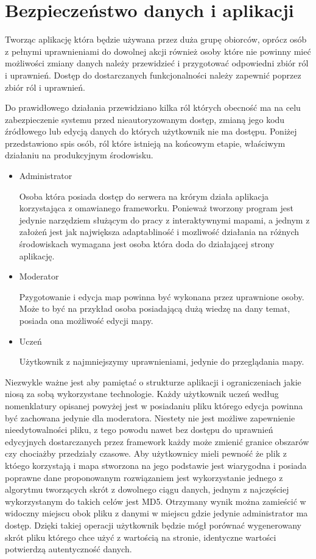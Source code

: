 ﻿\section{Bezpieczeństwo danych i aplikacji}
\label{sec:bezpieczenstwo}

Tworząc aplikację która będzie używana przez duża grupę obiorców, oprócz osób z pełnymi uprawnieniami do dowolnej akcji również osoby które nie powinny mieć możliwości zmiany danych należy przewidzieć i przygotować odpowiedni zbiór ról i uprawnień. Dostęp do dostarczanych funkcjonalności należy zapewnić poprzez zbiór ról i uprawnień.

Do prawidłowego działania przewidziano kilka ról których obecność ma na celu zabezpieczenie systemu przed nieautoryzowanym dostęp, zmianą jego kodu źródłowego lub edycją danych do których użytkownik nie ma dostępu. Poniżej przedstawiono spis osób, ról które istnieją na końcowym etapie, właściwym działaniu na produkcyjnym środowisku.

\begin{itemize}
\item
Administrator

Osoba która posiada dostęp do serwera na krórym działa aplikacja korzystająca z omawianego frameworku. Ponieważ tworzony program jest jedynie narzędziem służącym do pracy z interaktywnymi mapami, a jednym z założeń jest jak największa adaptabliność i mozliwość działania na różnych środowiskach wymagana jest osoba która doda do działającej strony aplikację.
\item
Moderator

Pzygotowanie i edycja map powinna być wykonana przez uprawnione osoby. Może to być na przykład osoba posiadającą dużą wiedzę na dany temat, posiada ona możliwość edycji mapy.
\item
Uczeń

Użytkownik z najmniejszymy uprawnieniami, jedynie do przeglądania mapy.
\end{itemize}

Niezwykle ważne jest aby pamiętać o strukturze aplikacji i ograniczeniach jakie niosą za sobą wykorzystane technologie. Każdy użytkownik uczeń według nomenklatury opisanej powyżej jest w posiadaniu pliku którego edycja powinna być zachowana jedynie dla moderatora. Niestety nie jest możliwe zapewnienie nieedytowalności pliku, z tego powodu nawet bez dostępu do uprawnień edycyjnych dostarczanych przez framework każdy może zmienić granice obszarów czy chociażby przedziały czasowe. Aby użytkownicy mieli pewność że plik z któego korzystają i mapa stworzona na jego podstawie jest wiarygodna i posiada poprawne dane proponowanym rozwiązaniem jest wykorzystanie jednego z algorytmu tworzących skrót z dowolnego ciągu danych, jednym z najczęściej wykorzystanym do takich celów jest MD5. Otrzymany wynik można zamieścić w widoczny miejscu obok pliku z danymi w miejscu gdzie jedynie administrator ma dostęp. Dzięki takiej operacji użytkownik będzie mógł porównać wygenerowany skrót pliku którego chce użyć z wartością na stronie, identyczne wartości potwierdzą autentyczność danych.

